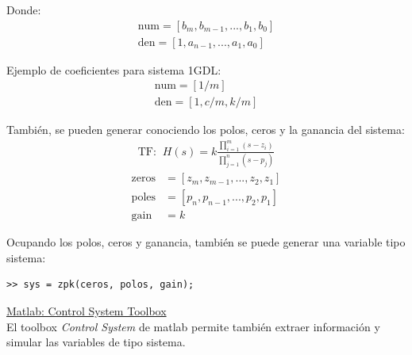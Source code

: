 Donde:
\begin{align*}
    \text{num} = [b_m, b_{m-1}, ... , b_1, b_0]\\
    \text{den} = [1, a_{n-1}, ... , a_1, a_0]
\end{align*}

Ejemplo de coeficientes para sistema 1GDL:
\begin{align*}
    \text{num} = [1/m]\\
    \text{den} = [1, c/m, k/m]
\end{align*}

También, se pueden generar conociendo los polos, ceros y la ganancia del sistema:
\begin{align*}
    \text{TF: }~H(s)= k\frac{\prod_{i=1}^m(s-z_i)}{\prod_{j=1}^n(s-p_j)}
\end{align*} 
\begin{align*}
    \text{zeros} &= [z_m, z_{m-1}, ..., z_2, z_1]\\
    \text{poles} &= [p_n, p_{n-1},..., p_2, p_1]\\
    \text{gain} &= k
\end{align*} 

\par Ocupando los polos, ceros y ganancia, también se puede generar una variable tipo sistema:
\begin{verbatim}
>> sys = zpk(ceros, polos, gain); 
\end{verbatim}

\underline{Matlab: Control System Toolbox}\\

El toolbox \emph{Control System} de matlab permite también extraer información y simular las variables de tipo sistema.


